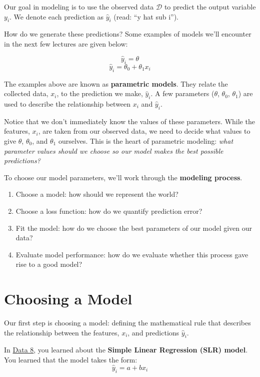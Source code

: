\documentclass[
  letterpaper,
  DIV=11,
  numbers=noendperiod]{scrreprt}
\providecommand{\tightlist}{%
  \setlength{\itemsep}{0pt}\setlength{\parskip}{0pt}}\usepackage{longtable,booktabs,array}
\begin{document}
Our goal in modeling is to use the observed data \(\mathcal{D}\) to
predict the output variable \(y_i\). We denote each prediction as
\(\hat{y}_i\) (read: ``y hat sub i'').

How do we generate these predictions? Some examples of models we'll
encounter in the next few lectures are given below:

\[\hat{y}_i = \theta\] \[\hat{y}_i = \theta_0 + \theta_1 x_i\]

The examples above are known as \textbf{parametric models}. They relate
the collected data, \(x_i\), to the prediction we make, \(\hat{y}_i\). A
few parameters (\(\theta\), \(\theta_0\), \(\theta_1\)) are used to
describe the relationship between \(x_i\) and \(\hat{y}_i\).

Notice that we don't immediately know the values of these parameters.
While the features, \(x_i\), are taken from our observed data, we need
to decide what values to give \(\theta\), \(\theta_0\), and \(\theta_1\)
ourselves. This is the heart of parametric modeling: \emph{what
parameter values should we choose so our model makes the best possible
predictions?}

To choose our model parameters, we'll work through the \textbf{modeling
process}.

\begin{enumerate}
\def\labelenumi{\arabic{enumi}.}
\tightlist
\item
  Choose a model: how should we represent the world?
\item
  Choose a loss function: how do we quantify prediction error?
\item
  Fit the model: how do we choose the best parameters of our model given
  our data?
\item
  Evaluate model performance: how do we evaluate whether this process
  gave rise to a good model?
\end{enumerate}

\section{Choosing a Model}\label{choosing-a-model}

Our first step is choosing a model: defining the mathematical rule that
describes the relationship between the features, \(x_i\), and
predictions \(\hat{y}_i\).

In
\href{https://inferentialthinking.com/chapters/15/4/Least_Squares_Regression.html}{Data
8}, you learned about the \textbf{Simple Linear Regression (SLR) model}.
You learned that the model takes the form: \[\hat{y}_i = a + bx_i\]
\end{document}
